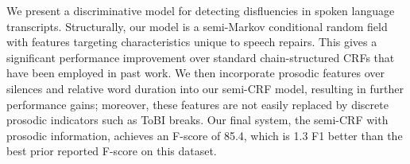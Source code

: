 We present a discriminative model for detecting disfluencies in spoken language transcripts. Structurally, our model is a semi-Markov conditional random field with features targeting characteristics unique to speech repairs. This gives a significant performance improvement over standard chain-structured CRFs that have been employed in past work. We then incorporate prosodic features over silences and relative word duration into our semi-CRF model, resulting in further performance gains; moreover, these features are not easily replaced by discrete prosodic indicators such as ToBI breaks. Our final system, the semi-CRF with prosodic information, achieves an F-score of 85.4, which is 1.3 F1 better than the best prior reported F-score on this dataset.
